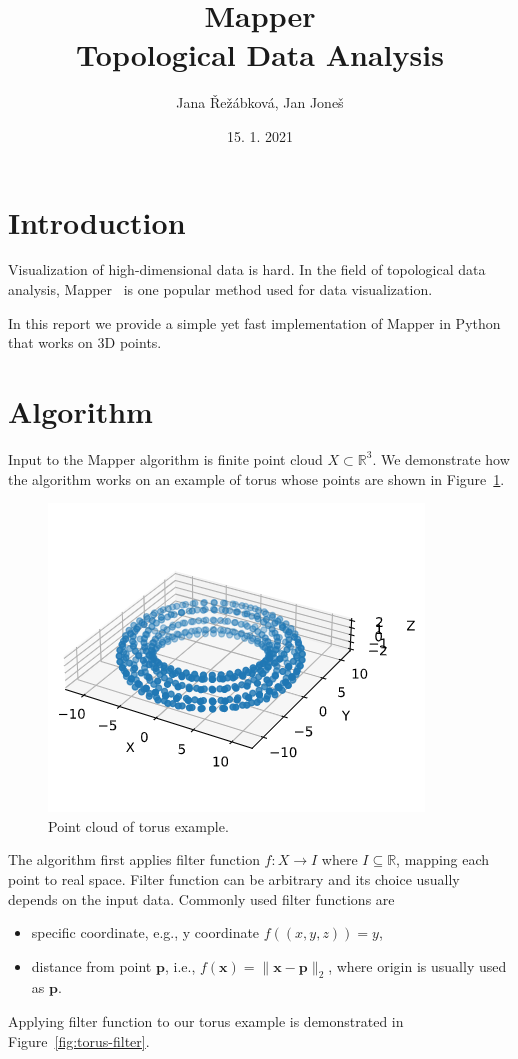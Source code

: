 \documentclass{article}
\title{\vspace{-4cm} Mapper \\ \vspace{0.2cm} \large Topological Data Analysis}
\author{Jana Řežábková, Jan Joneš}
\date{15. 1. 2021}
\begin{document}
\maketitle

\section{Introduction}

Visualization of high-dimensional data is hard.
In the field of topological data analysis, Mapper~\cite{mapper} is one popular method used for data visualization.

In this report we provide a simple yet fast implementation of Mapper in Python that works on 3D points.

\section{Algorithm}

Input to the Mapper algorithm is finite point cloud $X \subset \mathbb{R}^3$.
We demonstrate how the algorithm works on an example of torus whose points are shown in Figure~\ref{fig:torus-points}.

\begin{figure}[ht]
    \centering
    \includegraphics[width=0.7\columnwidth]{torus-point-cloud}
    \caption{Point cloud of torus example.}
    \label{fig:torus-points}
\end{figure}

The algorithm first applies filter function $f: X \to I$ where $I \subseteq \mathbb{R}$, mapping each point to real space.
Filter function can be arbitrary and its choice usually depends on the input data.
Commonly used filter functions are
\begin{itemize}
    \item specific coordinate, e.g., y coordinate $f((x, y, z)) = y$,
    \item distance from point $\mathbf{p}$, i.e., $f(\mathbf{x}) = \lVert \mathbf{x} - \mathbf{p} \rVert_2$, where origin is usually used as $\mathbf{p}$.
\end{itemize}
Applying filter function to our torus example is demonstrated in Figure~\ref{fig:torus-filter}.
\end{document}
